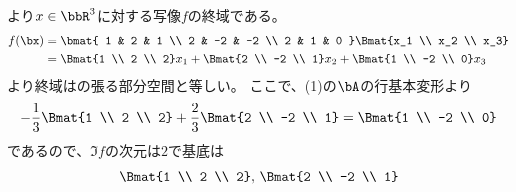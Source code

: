 \begin{ans*}
\begin{enumerate}[label=(\arabic*)]
    より$x\in\bbR^3$に対する写像$f$の終域である。
    \begin{align}
      f(\bx)
      &= \bmat{
        1 & 2 & 1 \\
        2 & -2 & -2 \\
        2 & 1 & 0
      } \Bmat{x_1 \\ x_2 \\ x_3}\\
      &=
      \Bmat{1 \\ 2 \\ 2} x_1
      +\Bmat{2 \\ -2 \\ 1} x_2
      +\Bmat{1 \\ -2 \\ 0} x_3
    \end{align}
    より終域はの張る部分空間と等しい。
    ここで、(1)の$\bA$の行基本変形より
    \begin{gather}
      -\frac{1}{3}\Bmat{1 \\ 2 \\ 2}
      +\frac{2}{3}\Bmat{2 \\ -2 \\ 1}
      =\Bmat{1 \\ -2 \\ 0}
    \end{gather}
    であるので、$\Im f$の次元は$2$で基底は
    \begin{gather}
      \Bmat{1 \\ 2 \\ 2},\,
      \Bmat{2 \\ -2 \\ 1}
    \end{gather}
  \end{enumerate}
\end{ans*}

